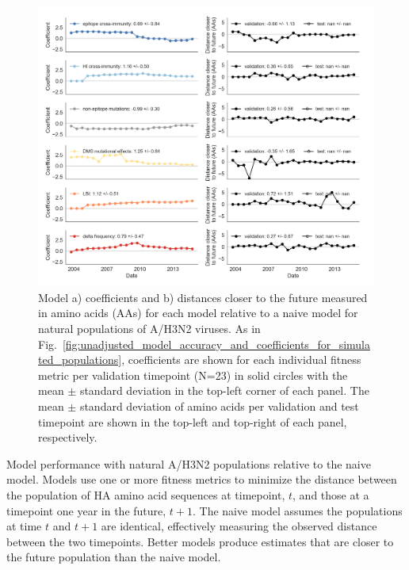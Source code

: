 \begin{figure}[ht]
  \begin{center}
  \includegraphics[width=\textwidth]{figures/unadjusted-model-accuracy-and-coefficients-for-natural-populations.png}
  \caption{
    Model a) coefficients and b) distances closer to the future measured in amino acids (AAs) for each model relative to a naive model for natural populations of A/H3N2 viruses.
    As in Fig.~\ref{fig:unadjusted_model_accuracy_and_coefficients_for_simulated_populations}, coefficients are shown for each individual fitness metric per validation timepoint (N=23) in solid circles with the mean $\pm$ standard deviation in the top-left corner of each panel.
    The mean $\pm$ standard deviation of amino acids per validation and test timepoint are shown in the top-left and top-right of each panel, respectively.
  }
  \label{fig:unadjusted_model_accuracy_and_coefficients_for_natural_populations}
  \end{center}
\end{figure}

\begin{table}[ht]
  \begin{center}
    
    \caption{
      Model performance with natural A/H3N2 populations relative to the naive model.
      Models use one or more fitness metrics to minimize the distance between the population of HA amino acid sequences at timepoint, $t$, and those at a timepoint one year in the future, $t + 1$.
      The naive model assumes the populations at time $t$ and $t + 1$ are identical, effectively measuring the observed distance between the two timepoints.
      Better models produce estimates that are closer to the future population than the naive model.
    }
    \label{table_natural_model_selection}
  \end{center}
\end{table}

